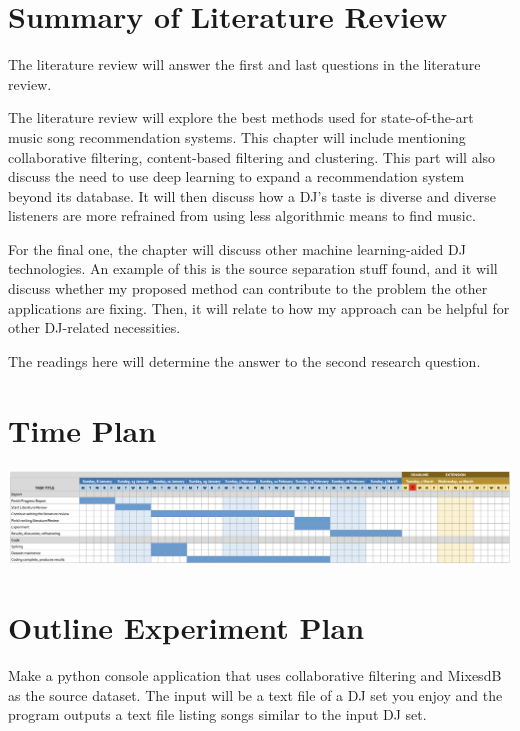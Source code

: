 \documentclass[]{article}
\begin{document}
	
\section{Summary of Literature Review}
\begin{flushleft}
	The literature review will answer the first and last questions in the literature review.
\end{flushleft}
\begin{flushleft}
	The literature review will explore the best methods used for state-of-the-art music song recommendation systems. This chapter will include mentioning collaborative filtering, content-based filtering and clustering. This part will also discuss the need to use deep learning to expand a recommendation system beyond its database. It will then discuss how a DJ's taste is diverse and diverse listeners are more refrained from using less algorithmic means to find music.
\end{flushleft}
\begin{flushleft}
	For the final one, the chapter will discuss other machine learning-aided DJ technologies. An example of this is the source separation stuff found, and it will discuss whether my proposed method can contribute to the problem the other applications are fixing. Then, it will relate to how my approach can be helpful for other DJ-related necessities. 
\end{flushleft}
\begin{flushleft}
	The readings here will determine the answer to the second research question.
	
\end{flushleft}

\section{Time Plan}
\begin{center}
\includegraphics[scale=0.4]{timePlan}
\end{center}


\section{Outline Experiment Plan}
Make a python console application that uses collaborative filtering and MixesdB as the source dataset. The input will be a text file of a DJ set you enjoy and the program outputs a text file listing songs similar to the input DJ set.
\end{document}
